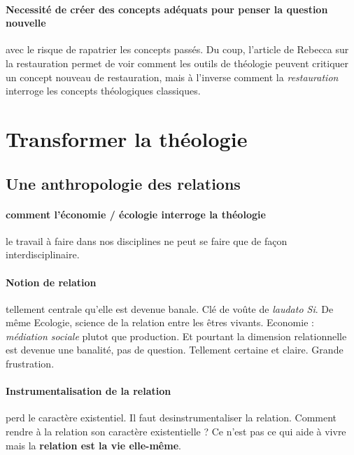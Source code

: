 \paragraph{Necessité de créer des concepts adéquats pour penser la question nouvelle} avec le risque de rapatrier les concepts passés. Du coup, l'article de Rebecca sur la restauration permet de voir comment les outils de théologie peuvent critiquer un concept nouveau de restauration, mais à l'inverse comment la \textit{restauration} interroge les concepts théologiques classiques.

\section{Transformer la théologie}

 \subsection{Une anthropologie des relations}


\paragraph{comment l'économie / écologie interroge la théologie} le travail à faire dans nos disciplines ne peut se faire que de façon interdisciplinaire. 

\paragraph{Notion de relation} tellement centrale qu'elle est devenue banale. Clé de voûte de \textit{laudato Si}. De même Ecologie, science de la relation entre les êtres vivants. Economie : \textit{médiation sociale} plutot que production. Et pourtant la dimension relationnelle est devenue une banalité, pas de question. Tellement certaine et claire. Grande frustration. 
\paragraph{Instrumentalisation de la relation} perd le caractère existentiel. Il faut desinstrumentaliser la relation. Comment rendre à la relation son caractère existentielle ? Ce n'est pas ce qui aide à vivre mais la \textbf{relation est la vie elle-même}. 

